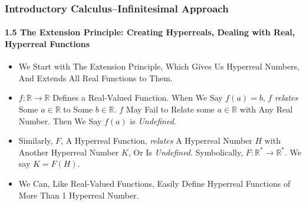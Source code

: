 \begin{frame}
\frametitle{Introductory Calculus--Infinitesimal Approach}
\framesubtitle{1.5 The Extension Principle: Creating Hyperreals, Dealing with Real, Hyperreal Functions}
\label{slide:1.5-05}
\begin{itemize}
\item We Start with \alert{The Extension Principle}, Which \alert{Gives Us Hyperreal Numbers}, And \alert{Extends All Real Functions to Them}.
\pause
\item $f:\mathbb{R}\rightarrow\mathbb{R}$ Defines a \alert{Real-Valued Function}. When We Say $f(a)=b$, $f$ \textit{relates} Some $a\in\mathbb{R}$ to Some $b\in\mathbb{R}$. $f$ May Fail to Relate some $a\in\mathbb{R}$ with Any Real Number. Then We Say $f(a)$ is \textit{Undefined}.
\pause\item Similarly, $F$, \alert{A Hyperreal Function}, \textit{relates} A Hyperreal Number $H$ with Another Hyperreal Number $K$, Or Is \textit{Undefined}. Symbolically, $F:\mathbb{R}^*\rightarrow\mathbb{R}^*$. We say $K=F(H)$.
\pause\item We Can, Like Real-Valued Functions, Easily Define Hyperreal Functions of More Than 1 Hyperreal Number.
\end{itemize}
\end{frame}

